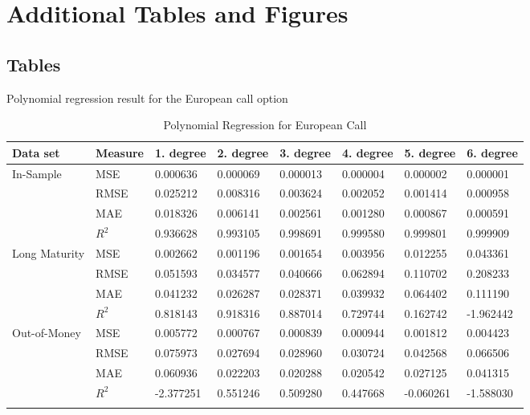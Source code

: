 
\chapter{Additional Tables and Figures} %

\label{AppendixD} %

\section{Tables}

\begin{table}[H]
\caption{Polynomial Regression for European Call}{Polynomial regression result for the European call option}
\label{tab:fullEuroCall}
\centering
\begin{tabular}{llllllll}
\toprule
\textbf{Data set} &  \textbf{Measure} & \textbf{1. degree} & \textbf{2. degree} & \textbf{3. degree} & {4. degree} & \textbf{5. degree} & {6. degree}\\
\midrule
In-Sample     &	MSE  & 0.000636 & 0.000069 & 0.000013 & 0.000004 & 0.000002 & 0.000001 \\
		      & RMSE & 0.025212 & 0.008316 & 0.003624 & 0.002052 & 0.001414 & 0.000958 \\
		      & MAE  & 0.018326 & 0.006141 & 0.002561 & 0.001280 & 0.000867 & 0.000591 \\
		      & $R^2$& 0.936628 & 0.993105 & 0.998691 & 0.999580 & 0.999801 & 0.999909 \\
Long Maturity & MSE  & 0.002662 & 0.001196 & 0.001654 & 0.003956 & 0.012255 & 0.043361 \\
		      & RMSE & 0.051593 & 0.034577 & 0.040666 & 0.062894 & 0.110702 & 0.208233 \\
		      & MAE  & 0.041232 & 0.026287 & 0.028371 & 0.039932 & 0.064402 & 0.111190 \\
		      & $R^2$& 0.818143 & 0.918316 & 0.887014 & 0.729744 & 0.162742 & -1.962442 \\
Out-of-Money  & MSE  & 0.005772 & 0.000767 & 0.000839 & 0.000944 & 0.001812 & 0.004423 \\
		      & RMSE & 0.075973 & 0.027694 & 0.028960 & 0.030724 & 0.042568 & 0.066506 \\
		      & MAE  & 0.060936 & 0.022203 & 0.020288 & 0.020542 & 0.027125 & 0.041315\\
		      & $R^2$& -2.377251 & 0.551246 & 0.509280 & 0.447668 & -0.060261 & -1.588030\\
\bottomrule\\
\end{tabular}
\end{table}

